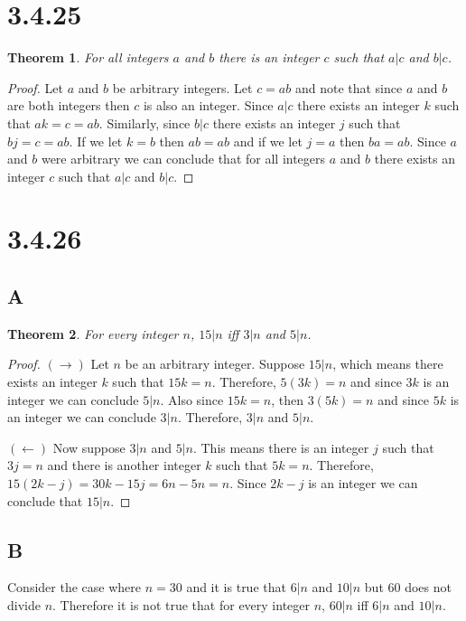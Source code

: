 \documentclass{article}
\newtheorem*{theorem}{Theorem}  %
\begin{document}
\section*{3.4.25}
\begin{theorem} For all integers $a$ and $b$ there is an integer $c$ such that $a|c$ and $b|c$.
\end{theorem}
\begin{proof}
Let $a$ and $b$ be arbitrary integers. Let $c = ab$ and note that since $a$ and $b$ are both integers then $c$ is also an integer. Since $a|c$ there exists an integer $k$ such that $ak = c = ab$. Similarly, since $b|c$ there exists an integer $j$ such that $bj = c = ab$. If we let $k = b$ then $ab = ab$ and if we let $j = a$ then $ba = ab$. Since $a$ and $b$ were arbitrary we can conclude that for all integers $a$ and $b$ there exists an integer $c$ such that $a|c$ and $b|c$.
\end{proof}

\section*{3.4.26}

\subsection*{A}
\begin{theorem} For every integer $n$, $15|n$ iff $3|n$ and $5|n$.
\end{theorem}
\begin{proof}
$(\rightarrow)$ Let $n$ be an arbitrary integer. Suppose $15|n$, which means there exists an integer $k$ such that $15k = n$. Therefore, $5(3k) = n$ and since $3k$ is an integer we can conclude $5|n$. Also since $15k = n$, then $3(5k) = n$ and since $5k$ is an integer we can conclude $3|n$. Therefore, $3|n$ and $5|n$.

$(\leftarrow)$ Now suppose $3|n$ and $5|n$. This means there is an integer $j$ such that $3j = n$ and there is another integer $k$ such that $5k = n$. Therefore, $15(2k-j) = 30k - 15j = 6n - 5n = n$. Since $2k-j$ is an integer we can conclude that $15|n$.

\end{proof}

\subsection{B}
Consider the case where $n = 30$ and it is true that $6|n$ and $10|n$ but $60$ does not divide $n$. Therefore it is not true that for every integer $n$, $60|n$ iff $6|n$ and $10|n$.
\end{document}
